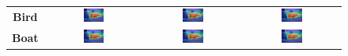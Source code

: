 \begin{figure}[ht]
\begin{tabular}{c c c c}
    \textbf{Bird}      & \includegraphics[width=0.23\textwidth]{figures/qualitative_analysis/test_cam/2010_005860_6.jpg} & \includegraphics[width=0.23\textwidth]{figures/qualitative_analysis/test_cam/2010_005860_6.jpg} & \includegraphics[width=0.23\textwidth]{figures/qualitative_analysis/test_cam/2010_005860_6.jpg} \\
    \textbf{Boat}      & \includegraphics[width=0.23\textwidth]{figures/qualitative_analysis/test_cam/2010_005860_6.jpg} & \includegraphics[width=0.23\textwidth]{figures/qualitative_analysis/test_cam/2010_005860_6.jpg} & \includegraphics[width=0.23\textwidth]{figures/qualitative_analysis/test_cam/2010_005860_6.jpg} \\

\end{tabular}
\end{figure}
